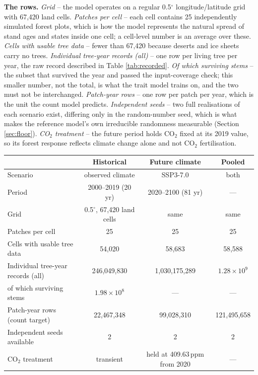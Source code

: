 \documentclass[11pt]{article}
\begin{document}
\begin{table}[h]
{\textbf{The rows.} \emph{Grid} -- the model operates on a regular 0.5$^\circ$ longitude/latitude grid with 67{,}420 land cells. \emph{Patches per cell} -- each cell contains 25 independently simulated forest plots, which is how the model represents the natural spread of stand ages and states inside one cell; a cell-level number is an average over these. \emph{Cells with usable tree data} -- fewer than 67{,}420 because deserts and ice sheets carry no trees. \emph{Individual tree-year records (all)} -- one row per living tree per year, the raw record described in Table \ref{tab:recorded}. \emph{Of which surviving stems} -- the subset that survived the year and passed the input-coverage check; this smaller number, not the total, is what the trait model trains on, and the two must not be interchanged. \emph{Patch-year rows} -- one row per patch per year, which is the unit the count model predicts. \emph{Independent seeds} -- two full realisations of each scenario exist, differing only in the random-number seed, which is what makes the reference model's own irreducible randomness measurable (Section \ref{sec:floor}). \emph{CO$_2$ treatment} -- the future period holds CO$_2$ fixed at its 2019 value, so its forest response reflects climate change alone and not CO$_2$ fertilisation.}
\label{tab:scale}
\small
\begin{tabular}{lccc}
\toprule
& Historical & Future climate & Pooled \\
\midrule
Scenario & observed climate & SSP3-7.0 & both \\
Period & 2000--2019 (20 yr) & 2020--2100 (81 yr) & --- \\
Grid & 0.5$^\circ$, 67{,}420 land cells & same & same \\
Patches per cell & 25 & 25 & 25 \\
Cells with usable tree data & 54{,}020 & 58{,}683 & 58{,}588 \\
Individual tree-year records (all) & 246{,}049{,}830 & 1{,}030{,}175{,}289 & $1.28 \times 10^{9}$ \\
\quad of which surviving stems & $1.98 \times 10^{8}$ & --- & --- \\
Patch-year rows (count target) & 22{,}467{,}348 & 99{,}028{,}310 & 121{,}495{,}658 \\
Independent seeds available & 2 & 2 & 2 \\
CO$_2$ treatment & transient & held at 409.63\,ppm from 2020 & --- \\
\bottomrule
\end{tabular}
\end{table}
\end{document}
